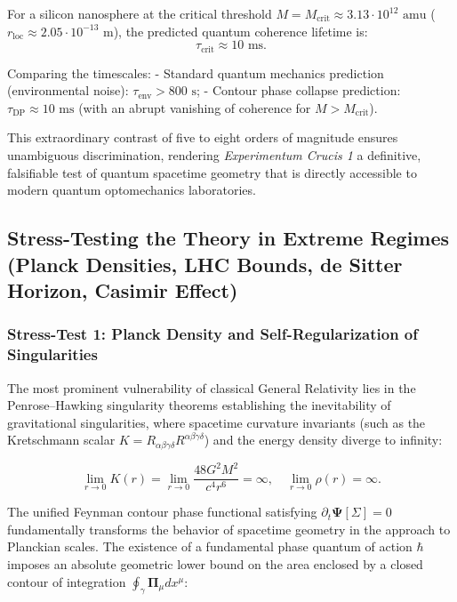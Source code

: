 \documentclass[11pt,a4paper]{article}
\theoremstyle{definition}
\begin{document}
For a silicon nanosphere at the critical threshold $M = M_{\text{crit}} \approx 3.13 \cdot 10^{12}\text{ amu}$ ($r_{\text{loc}} \approx 2.05 \cdot 10^{-13}\text{ m}$), the predicted quantum coherence lifetime is:
\begin{equation}\label{eq:5.50b}\tag{5.50b}
\tau_{\text{crit}} \approx 10\text{ ms}.
\end{equation}

Comparing the timescales:
- Standard quantum mechanics prediction (environmental noise): $\tau_{\text{env}} > 800\text{ s}$;
- Contour phase collapse prediction: $\tau_{\text{DP}} \approx 10\text{ ms}$ (with an abrupt vanishing of coherence for $M > M_{\text{crit}}$).

This extraordinary contrast of five to eight orders of magnitude ensures unambiguous discrimination, rendering \textit{Experimentum Crucis 1} a definitive, falsifiable test of quantum spacetime geometry that is directly accessible to modern quantum optomechanics laboratories.

\subsection{Stress-Testing the Theory in Extreme Regimes (Planck Densities, LHC Bounds, de Sitter Horizon, Casimir Effect)}\label{sec:5.4}

\subsubsection{Stress-Test 1: Planck Density and Self-Regularization of Singularities}\label{sec:5.4.1}

The most prominent vulnerability of classical General Relativity lies in the Penrose--Hawking singularity theorems establishing the inevitability of gravitational singularities, where spacetime curvature invariants (such as the Kretschmann scalar $K = R_{\alpha\beta\gamma\delta}R^{\alpha\beta\gamma\delta}$) and the energy density diverge to infinity:

\begin{equation}\label{eq:5.51}\tag{5.51}
\lim_{r \to 0} K(r) = \lim_{r \to 0} \frac{48 G^2 M^2}{c^4 r^6} = \infty, \quad \lim_{r \to 0} \rho(r) = \infty.
\end{equation}

The unified Feynman contour phase functional satisfying $\partial_t \mathbf{\Psi}[\Sigma] = 0$ fundamentally transforms the behavior of spacetime geometry in the approach to Planckian scales. The existence of a fundamental phase quantum of action $\hbar$ imposes an absolute geometric lower bound on the area enclosed by a closed contour of integration $\oint_\gamma \mathbf{\Pi}_\mu dx^\mu$:
\end{document}

